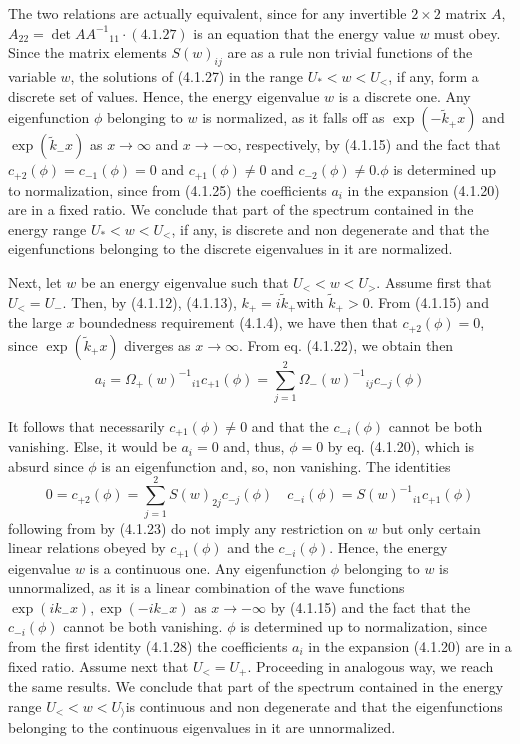 \documentclass{article}
\begin{document}
The two relations are actually equivalent, since for any invertible $2 \times 2$ matrix $A$, $A_{22}=\operatorname{det} A A^{-1}{ }_{11} \cdot(4.1 .27)$ is an equation that the energy value $w$ must obey. Since the matrix elements $S(w)_{i j}$ are as a rule non trivial functions of the variable $w$, the solutions of (4.1.27) in the range $U_{*}<w<U_{<}$, if any, form a discrete set of values. Hence, the energy eigenvalue $w$ is a discrete one. Any eigenfunction $\phi$ belonging to $w$ is normalized, as it falls off as $\exp \left(-\tilde{k}_{+} x\right)$ and $\exp \left(\tilde{k}_{-} x\right)$ as $x \rightarrow \infty$ and $x \rightarrow-\infty$, respectively, by (4.1.15) and the fact that $c_{+2}(\phi)=c_{-1}(\phi)=0$ and $c_{+1}(\phi) \neq 0$ and $c_{-2}(\phi) \neq 0 . \phi$ is determined up to normalization, since from (4.1.25) the coefficients $a_{i}$ in the expansion (4.1.20) are in a fixed ratio. We conclude that part of the spectrum contained in the energy range $U_{*}<w<U_{<}$, if any, is discrete and non degenerate and that the eigenfunctions belonging to the discrete eigenvalues in it are normalized.

Next, let $w$ be an energy eigenvalue such that $U_{<}<w<U_{>}$. Assume first that $U_{<}=U_{-}$. Then, by (4.1.12), (4.1.13), $k_{+}=i \tilde{k}_{+}$with $\tilde{k}_{+}>0$. From (4.1.15) and the large $x$ boundedness requirement (4.1.4), we have then that $c_{+2}(\phi)=0$, since $\exp \left(\tilde{k}_{+} x\right)$ diverges as $x \rightarrow \infty$. From eq. (4.1.22), we obtain then
$$
\begin{equation*}
a_{i}=\Omega_{+}(w)^{-1}{ }_{i 1} c_{+1}(\phi)=\sum_{j=1}^{2} \Omega_{-}(w)^{-1}{ }_{i j} c_{-j}(\phi) \tag{4.1.28}
\end{equation*}
$$

It follows that necessarily $c_{+1}(\phi) \neq 0$ and that the $c_{-i}(\phi)$ cannot be both vanishing. Else, it would be $a_{i}=0$ and, thus, $\phi=0$ by eq. (4.1.20), which is absurd since $\phi$ is an eigenfunction and, so, non vanishing. The identities
$$
\begin{equation*}
0=c_{+2}(\phi)=\sum_{j=1}^{2} S(w)_{2 j} c_{-j}(\phi) \quad c_{-i}(\phi)=S(w)^{-1}{ }_{i 1} c_{+1}(\phi) \tag{4.1.29}
\end{equation*}
$$
following from by (4.1.23) do not imply any restriction on $w$ but only certain linear relations obeyed by $c_{+1}(\phi)$ and the $c_{-i}(\phi)$. Hence, the energy eigenvalue $w$ is a continuous one. Any eigenfunction $\phi$ belonging to $w$ is unnormalized, as it is a linear combination of the wave functions $\exp \left(i k_{-} x\right), \exp \left(-i k_{-} x\right)$ as $x \rightarrow-\infty$ by (4.1.15) and the fact that the $c_{-i}(\phi)$ cannot be both vanishing. $\phi$ is determined up to normalization, since from the first identity (4.1.28) the coefficients $a_{i}$ in the expansion (4.1.20) are in a fixed ratio. Assume next that $U_{<}=U_{+}$. Proceeding in analogous way, we reach the same results. We conclude that part of the spectrum contained in the energy range $U_{<}<w<U_{\rangle}$is continuous and non degenerate and that the eigenfunctions belonging to the continuous eigenvalues in it are unnormalized.
\end{document}
